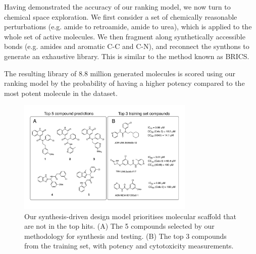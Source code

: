 
Having demonstrated the accuracy of our ranking model, we now turn to chemical space exploration. We first consider a set of chemically reasonable perturbations (e.g. amide to retroamide, amide to urea), which is applied to the whole set of active molecules. We then fragment along synthetically accessible bonds (e.g. amides and aromatic C-C and C-N), and reconnect the synthons to generate an exhaustive library. This is similar to the method known as BRICS. 

The resulting library of 8.8 million generated molecules is scored using our ranking model by the probability of having a higher potency compared to the most potent molecule in the dataset.

\begin{figure}
    \centering
        \includegraphics[width=0.75\textwidth]{Chapters/Ranking/Figs/fig2.pdf}
        \caption{Our synthesis-driven design model prioritises molecular scaffold that are not in the top hits. (A) The 5 compounds selected by our methodology for synthesis and testing. (B) The top 3 compounds from the training set, with potency and cytotoxicity measurements.}
        \label{fig:compounds}
\end{figure}

